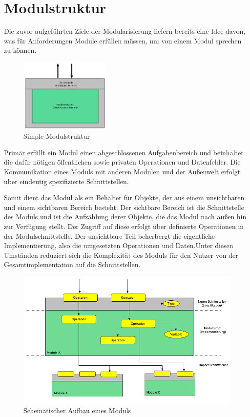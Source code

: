   \section{Modulstruktur}
      Die zuvor aufgeführten Ziele der Modularisierung liefern bereits eine Idee davon, was für Anforderungen Module erfüllen müssen, um von einem Modul sprechen zu können. 
        \begin{figure}[h!] 
        \centering
        \includegraphics[width=0.4\textwidth]{material/images/simple-module.png}
        \caption{Simple Modulstruktur}
        \label{fig:simple-module}
      \end{figure}
    Primär erfüllt ein Modul einen abgeschlossenen Aufgabenbereich und beinhaltet die dafür nötigen öffentlichen sowie privaten Operationen und Datenfelder. Die Kommunikation eines Moduls mit anderen Modulen und der Außenwelt erfolgt über eindeutig spezifizierte Schnittstellen.


    Somit dient das Modul als ein Behälter für Objekte, der aus einem unsichtbaren und einem sichtbaren Bereich besteht. Der sichtbare Bereich ist die Schnittstelle des Moduls und ist die Aufzählung derer Objekte, die das Modul nach außen hin zur Verfügung stellt. Der Zugriff auf diese erfolgt über definierte Operationen in der Modulschnittstelle. Der unsichtbare Teil beherbergt die eigentliche Implementierung, also die umgesetzten Operationen und Daten.Unter diesen Umständen reduziert sich die Komplexität des Moduls für den Nutzer von der Gesamtimplementation auf die Schnittstellen. 

      \begin{figure}[h!]
        \centering
        \includegraphics[width=\textwidth]{material/images/module-workflow.png}
        \caption{Schematischer Aufbau eines Moduls}
        \label{fig:mw}
      \end{figure} 


